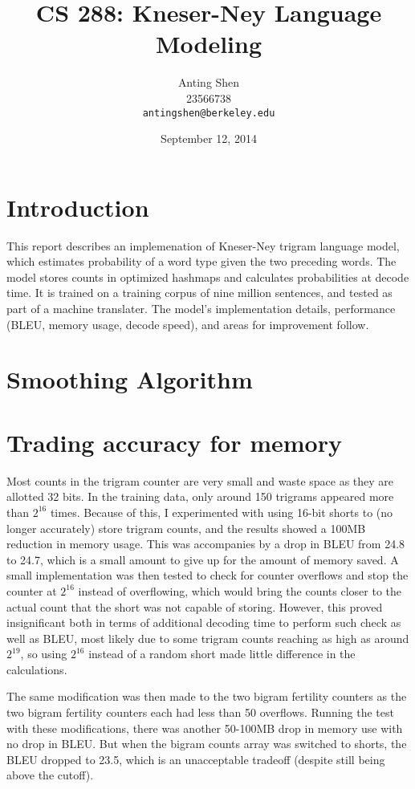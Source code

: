 \documentclass[11pt]{article}
\title{CS 288: Kneser-Ney Language Modeling}
\author{Anting Shen \\
  23566738 \\
  {\tt antingshen@berkeley.edu} \\
}
\date{September 12, 2014}
\begin{document}
\maketitle

\section{Introduction}

This report describes an implemenation of Kneser-Ney trigram language model, which estimates probability of a word type given the two preceding words. The model stores counts in optimized hashmaps and calculates probabilities at decode time. It is trained on a training corpus of nine million sentences, and tested as part of a machine translater. The model's implementation details, performance (BLEU, memory usage, decode speed), and areas for improvement follow.

\section{Smoothing Algorithm}



\section{Trading accuracy for memory}

Most counts in the trigram counter are very small and waste space as they are allotted 32 bits. In the training data, only around 150 trigrams appeared more than $2^{16}$ times. Because of this, I experimented with using 16-bit shorts to (no longer accurately) store trigram counts, and the results showed a 100MB reduction in memory usage. This was accompanies by a drop in BLEU from 24.8 to 24.7, which is a small amount to give up for the amount of memory saved. A small implementation was then tested to check for counter overflows and stop the counter at $2^{16}$ instead of overflowing, which would bring the counts closer to the actual count that the short was not capable of storing. However, this proved insignificant both in terms of additional decoding time to perform such check as well as BLEU, most likely due to some trigram counts reaching as high as around $2^{19}$, so using $2^{16}$ instead of a random short made little difference in the calculations.

The same modification was then made to the two bigram fertility counters as the two bigram fertility counters each had less than 50 overflows. Running the test with these modifications, there was another 50-100MB drop in memory use with no drop in BLEU. But when the bigram counts array was switched to shorts, the BLEU dropped to 23.5, which is an unacceptable tradeoff (despite still being above the cutoff).
\end{document}
